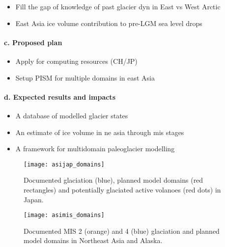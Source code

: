 \documentclass{article}
\begin{document}
    \begin{itemize}
      \item{Fill the gap of knowledge of past glacier dyn in East vs West Arctic}
      \item{East Asia ice volume contribution to pre-LGM sea level drops}
    \end{itemize}

\paragraph{c. Proposed plan}

    \begin{itemize}
      \item{Apply for computing resources (CH/JP)}
      \item{Setup PISM for multiple domains in east Asia}
    \end{itemize}

\paragraph{d. Expected results and impacts}

    \begin{itemize}
      \item{A database of modelled glacier states}
      \item{An estimate of ice volume in ne asia through mis stages}
      \item{A framework for multidomain paleoglacier modelling}
    \end{itemize}

    \begin{figure}
      \centerline{\texttt{[image: asijap\_domains]}}
      \caption{%
        Documented glaciation (blue), planned model domains (red rectangles)
        and potentially glaciated active volanoes (red dots) in Japan.}
      \label{fig:japan}
    \end{figure}

    \begin{figure}
      \centerline{\texttt{[image: asimis\_domains]}}
      \caption{%
        Documented MIS 2 (orange) and 4 (blue) glaciation and planned model
        domains in Northeast Asia and Alaska.}
      \label{fig:asia}
    \end{figure}
\end{document}
